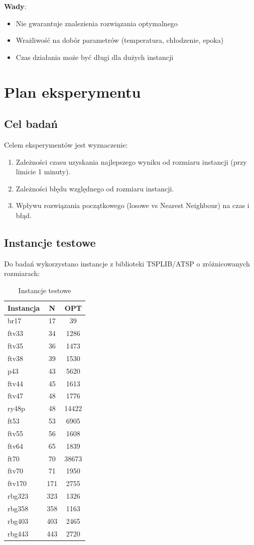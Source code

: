 \documentclass[a4paper,12pt]{article}
\begin{document}
\textbf{Wady}:
\begin{itemize}
    \item Nie gwarantuje znalezienia rozwiązania optymalnego
    \item Wrażliwość na dobór parametrów (temperatura, chłodzenie, epoka)
    \item Czas działania może być długi dla dużych instancji
\end{itemize}

\section{Plan eksperymentu}

\subsection{Cel badań}

Celem eksperymentów jest wyznaczenie:
\begin{enumerate}
    \item Zależności czasu uzyskania najlepszego wyniku od rozmiaru instancji (przy limicie 1 minuty).
    \item Zależności błędu względnego od rozmiaru instancji.
    \item Wpływu rozwiązania początkowego (losowe vs Nearest Neighbour) na czas i błąd.
\end{enumerate}

\subsection{Instancje testowe}

Do badań wykorzystano instancje z biblioteki TSPLIB/ATSP o zróżnicowanych rozmiarach:

\begin{table}[H]
\centering
\caption{Instancje testowe}
\begin{tabular}{|l|c|c|}
\hline
\textbf{Instancja} & \textbf{N} & \textbf{OPT} \\
\hline
br17 & 17 & 39 \\
ftv33 & 34 & 1286 \\
ftv35 & 36 & 1473 \\
ftv38 & 39 & 1530 \\
p43 & 43 & 5620 \\
ftv44 & 45 & 1613 \\
ftv47 & 48 & 1776 \\
ry48p & 48 & 14422 \\
ft53 & 53 & 6905 \\
ftv55 & 56 & 1608 \\
ftv64 & 65 & 1839 \\
ft70 & 70 & 38673 \\
ftv70 & 71 & 1950 \\
ftv170 & 171 & 2755 \\
rbg323 & 323 & 1326 \\
rbg358 & 358 & 1163 \\
rbg403 & 403 & 2465 \\
rbg443 & 443 & 2720 \\
\hline
\end{tabular}
\end{table}
\end{document}
